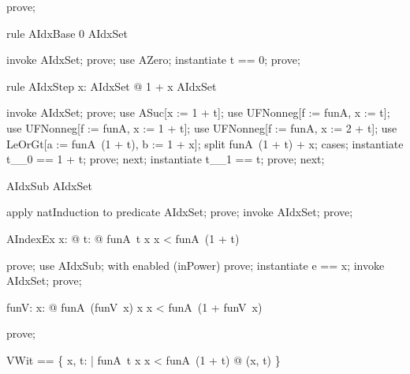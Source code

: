 \documentclass{article}
\begin{document}
\begin{zproof}
prove;
\end{zproof}

\begin{theorem}{rule AIdxBase}
  0 \in AIdxSet
\end{theorem}

\begin{zproof}
invoke AIdxSet;
prove;
use AZero;
instantiate t == 0;
prove;
\end{zproof}

\begin{theorem}{rule AIdxStep}
  \forall x: AIdxSet @ 1 + x \in AIdxSet
\end{theorem}

\begin{zproof}
invoke AIdxSet;
prove;
use ASuc[x := 1 + t];
use UFNonneg[f := funA, x := t];
use UFNonneg[f := funA, x := 1 + t];
use UFNonneg[f := funA, x := 2 + t];
use LeOrGt[a := funA~(1 + t), b := 1 + x];
split funA~(1 + t)  + x;
cases;
instantiate t\_\_0 == 1 + t;
prove;
next;
instantiate t\_\_1 == t;
prove;
next;
\end{zproof}

\begin{theorem}{AIdxSub}
  \nat \subseteq AIdxSet
\end{theorem}

\begin{zproof}
apply natInduction to predicate \nat \subseteq AIdxSet;
prove;
invoke AIdxSet;
prove;
\end{zproof}

\begin{theorem}{AIndexEx}
  \forall x: \nat @ \exists t: \nat @ funA~t \leq x \land x < funA~(1 + t)
\end{theorem}

\begin{zproof}
prove;
use AIdxSub;
with enabled (inPower) prove;
instantiate e == x;
invoke AIdxSet;
prove;
\end{zproof}

\begin{axdef}
  funV: \nat \fun \nat
\where
   \forall x: \nat @ funA~(funV~x) \leq x \land x < funA~(1 + funV~x)
\end{axdef}

\begin{zproof}
prove;
\end{zproof}

\begin{zed}
  VWit == \{ x, t: \nat | funA~t \leq x \land x < funA~(1 + t) @ (x, t) \}
\end{zed}
\end{document}
